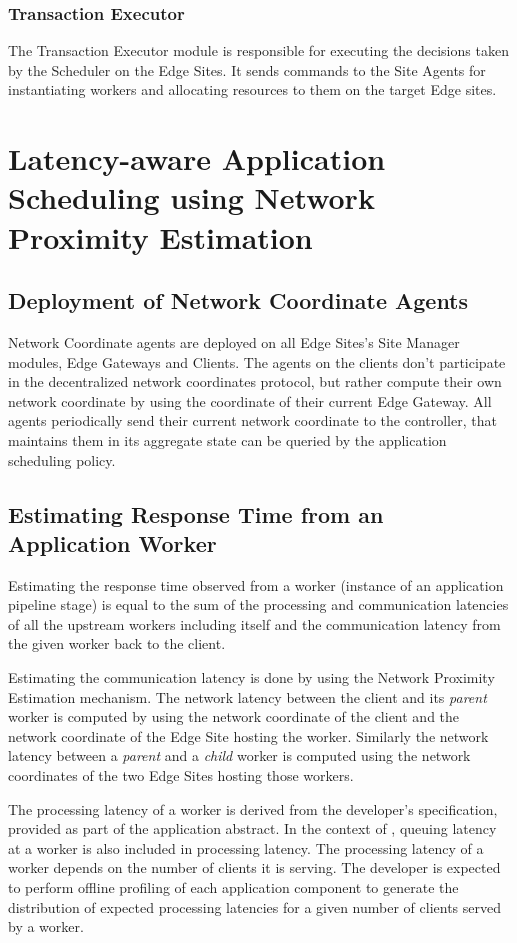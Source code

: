 \subsubsection{Transaction Executor}
The Transaction Executor module is responsible for executing the decisions taken by the Scheduler on the Edge Sites. It sends commands to the Site Agents for instantiating workers and allocating resources to them on the target Edge sites.

\section{Latency-aware Application Scheduling using Network Proximity Estimation}
\label{sec:oneedge_nw_prox}
\subsection{Deployment of Network Coordinate Agents}
Network Coordinate agents are deployed on all Edge Sites's Site Manager modules, Edge Gateways and Clients. The agents on the clients don't participate in the decentralized network coordinates protocol, but rather compute their own network coordinate by using the coordinate of their current Edge Gateway. All agents periodically send their current network coordinate to the controller, that maintains them in its aggregate state can be queried by the application scheduling policy.

\subsection{Estimating Response Time from an Application Worker}
\par Estimating the response time observed from a worker (instance of an application pipeline stage) is equal to the sum of the processing and communication latencies of all the upstream workers including itself and the communication latency from the given worker back to the client. 
\par Estimating the communication latency is done by using the Network Proximity Estimation mechanism. The network latency between the client and its \textit{parent} worker is computed by using the network coordinate of the client and the network coordinate of the Edge Site hosting the worker. Similarly the network latency between a \textit{parent} and a \textit{child} worker is computed using the network coordinates of the two Edge Sites hosting those workers.
\par The processing latency of a worker is derived from the developer's specification, provided as part of the application abstract. In the context of \oneedge{}, queuing latency at a worker is also included in processing latency. The processing latency of a worker depends on the number of clients it is serving. The developer is expected to perform offline profiling of each application component to generate the distribution of expected processing latencies for a given number of clients served by a worker.


